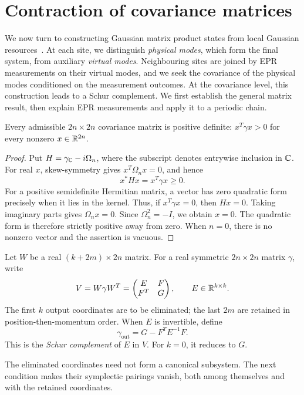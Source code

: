 \section{Contraction of covariance matrices}
\label{sec:contraction}
We now turn to constructing Gaussian matrix product states from local Gaussian
resources~\cite[Secs.~3 and~6]{schuch}. At each site, we distinguish \emph{physical
modes}, which form the final system, from auxiliary \emph{virtual modes}. Neighbouring
sites are joined by EPR measurements on their virtual modes, and we seek the
covariance of the physical modes conditioned on the measurement outcomes.
At the covariance level, this construction leads to a Schur complement.
We first establish the general matrix result, then explain EPR measurements
and apply it to a periodic chain.

\begin{theorem}\label{thm:admissible-positive}
Every admissible $2n\times2n$ covariance matrix is positive definite:
$x^T\gamma x>0$ for every nonzero $x\in\mathbb R^{2n}$.
\end{theorem}
\begin{proof}
Put $H=\gamma_{\mathbb C}-i\Omega_n$, where the subscript denotes entrywise inclusion
in $\mathbb C$. For real $x$, skew-symmetry gives $x^T\Omega_nx=0$, and hence
\[
 x^*Hx=x^T\gamma x\geq0.
\]
For a positive semidefinite Hermitian matrix, a vector has zero quadratic
form precisely when it lies in the kernel. Thus, if $x^T\gamma x=0$, then
$Hx=0$. Taking imaginary parts gives $\Omega_nx=0$. Since $\Omega_n^2=-I$,
we obtain $x=0$. The quadratic form is therefore strictly positive away from
zero. When $n=0$, there is no nonzero vector and the assertion is vacuous.
\end{proof}

\begin{definition}\label{def:contraction}
Let $W$ be a real $(k+2m)\times2n$ matrix. For a real symmetric $2n\times2n$ matrix $\gamma$, write
\[
 V=W\gamma W^T=\begin{pmatrix}E&F\\F^T&G\end{pmatrix},
 \qquad E\in\mathbb R^{k\times k}.
\]
The first $k$ output coordinates are to be eliminated; the last $2m$ are
retained in position-then-momentum order. When $E$ is invertible, define
\[
 \gamma_{\mathrm{out}}=G-F^TE^{-1}F.
\]
This is the \emph{Schur complement} of $E$ in $V$. For $k=0$, it reduces to $G$.
\end{definition}
 The eliminated coordinates need not form a canonical subsystem. The next
condition makes their symplectic pairings vanish, both among themselves and
with the retained coordinates.

